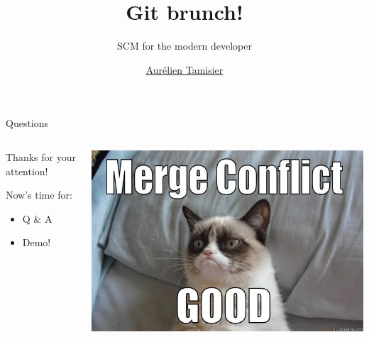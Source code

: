 \documentclass{beamer}
\title{Git brunch!}
\subtitle{SCM for the modern developer}
\author{\href{mailto://virtualtam@flibidi.net}{Aurélien Tamisier}}
\institute{The Internet}
\begin{document}
\frame{\titlepage}





\begin{frame}{Questions}
  \begin{columns}[t]
    \begin{column}{0.4\textwidth}
      Thanks for your attention!

      Now's time for:
      \begin{itemize}
      \item Q \& A
      \item Demo!
      \end{itemize}
    \end{column}
    \begin{column}{0.6\textwidth}
      \begin{center}
        \includegraphics[width=\textwidth]{img/gitgrumpy.jpg}
      \end{center}
    \end{column}
  \end{columns}
\end{frame}

\appendix

\end{document}
